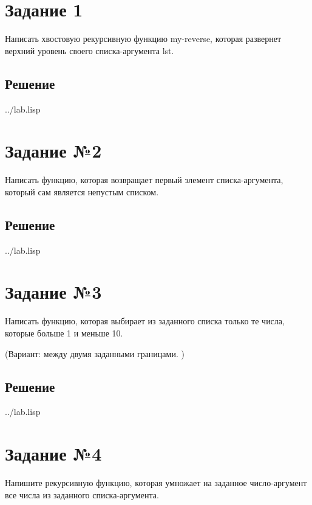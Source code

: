 \section*{Задание 1}
Написать хвостовую рекурсивную функцию my-reverse, которая развернет верхний
уровень своего списка-аргумента lst.

\subsection*{Решение}
\begin{lstinputlisting}[label=third,caption=Решение задания №1, language=lisp, firstline=2, lastline=7]{../lab.lisp}
\end{lstinputlisting}

\section*{Задание №2}
Написать функцию, которая возвращает первый элемент списка-аргумента, который сам
является непустым списком.

\subsection*{Решение}
\begin{lstinputlisting}[label=third,caption=Решение задания №2, language=lisp, firstline=10, lastline=13]{../lab.lisp}
\end{lstinputlisting}

\section*{Задание №3}
Написать функцию, которая выбирает из заданного списка только те числа, которые
больше 1 и меньше 10.

(Вариант: между двумя заданными границами. )
\subsection*{Решение}
\begin{lstinputlisting}[label=third,caption=Решение задания №3, language=lisp, firstline=16, lastline=19]{../lab.lisp}
\end{lstinputlisting}

\section*{Задание №4}
Напишите рекурсивную функцию, которая умножает на заданное число-аргумент все
числа
из заданного списка-аргумента.

